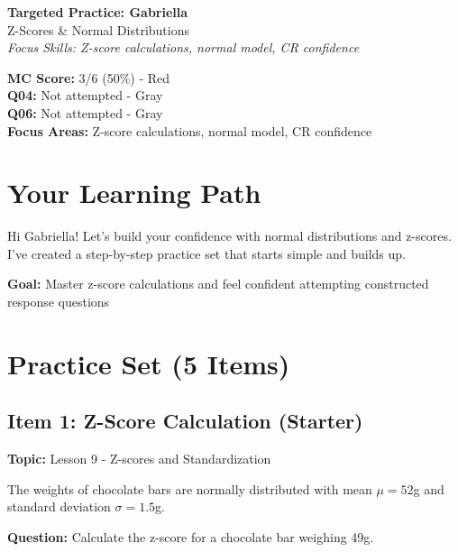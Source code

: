 \documentclass[11pt]{article}
\begin{document}
\begin{center}
{\LARGE \textbf{Targeted Practice: Gabriella}}\\[0.05in]
{\large Z-Scores \& Normal Distributions}\\[0.05in]
\textit{Focus Skills: Z-score calculations, normal model, CR confidence}
\end{center}

\vspace{0.15in}

\begin{tcolorbox}[colback=red!10!white,colframe=red!75!black,title=\textbf{Performance Summary}]
\textbf{MC Score:} 3/6 (50\%) - Red\\
\textbf{Q04:} Not attempted - Gray\\
\textbf{Q06:} Not attempted - Gray\\
\textbf{Focus Areas:} Z-score calculations, normal model, CR confidence
\end{tcolorbox}

\vspace{0.15in}

\section*{Your Learning Path}

Hi Gabriella! Let's build your confidence with normal distributions and z-scores. I've created a step-by-step practice set that starts simple and builds up.

\textbf{Goal:} Master z-score calculations and feel confident attempting constructed response questions

\vspace{0.15in}

\section*{Practice Set (5 Items)}

\subsection*{Item 1: Z-Score Calculation (Starter)}
\textbf{Topic:} Lesson 9 - Z-scores and Standardization

The weights of chocolate bars are normally distributed with mean $\mu = 52$g and standard deviation $\sigma = 1.5$g.

\textbf{Question:} Calculate the z-score for a chocolate bar weighing 49g.
\end{document}
